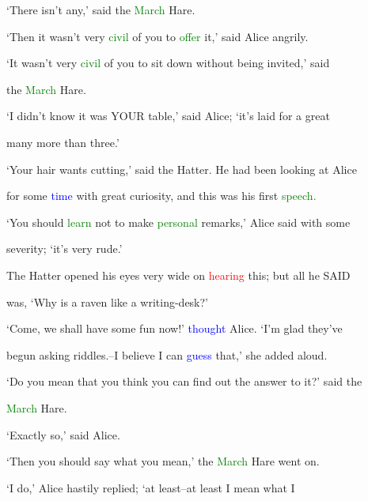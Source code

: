  ‘There isn’t any,’ said the \textcolor{green}{March} Hare.



 ‘Then it wasn’t very \textcolor{green}{civil} of you to \textcolor{green}{offer} it,’ said Alice angrily.



 ‘It wasn’t very \textcolor{green}{civil} of you to sit down without being \textcolor{BurntOrange}{invited,’} said

 the \textcolor{green}{March} Hare.



 ‘I didn’t know it was YOUR table,’ said Alice; ‘it’s laid for a great

 many more than three.’



 ‘Your hair wants cutting,’ said the Hatter. He had been looking at Alice

 for some \textcolor{blue}{time} with great \textcolor{BurntOrange}{curiosity,} and this was his first \textcolor{green}{speech.}



 ‘You should \textcolor{green}{learn} not to make \textcolor{green}{personal} remarks,’ Alice said with some

 severity; ‘it’s very rude.’



 The Hatter opened his eyes very wide on \textcolor{red}{hearing} this; but all he SAID

 was, ‘Why is a raven like a writing-desk?’



 ‘Come, we shall have some \textcolor{BurntOrange}{fun} now!’ \textcolor{blue}{thought} Alice. ‘I’m \textcolor{BurntOrange}{glad} they’ve

 begun asking riddles.--I believe I can \textcolor{blue}{guess} that,’ she added aloud.



 ‘Do you mean that you think you can find out the answer to it?’ said the

 \textcolor{green}{March} Hare.



 ‘Exactly so,’ said Alice.



 ‘Then you should say what you mean,’ the \textcolor{green}{March} Hare went on.



 ‘I do,’ Alice hastily replied; ‘at least--at least I mean what I

